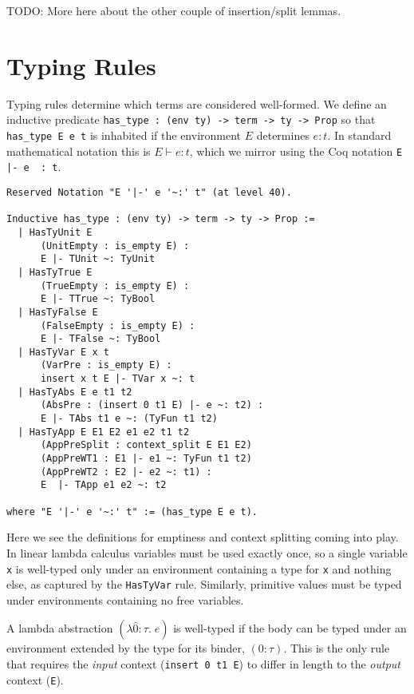 \documentclass[]{unswthesis}
\newcommand{\types}{\vdash}
\let\c\texttt
\let\i\textit
\begin{document}
TODO: More here about the other couple of insertion/split lemmas.


\section{Typing Rules}

Typing rules determine which terms are considered well-formed. We define an inductive predicate \c{has_type : (env ty) -> term -> ty -> Prop} so that \c{has_type E e t} is inhabited if the environment $E$ determines $e : t$. In standard mathematical notation this is $E \types e : t$, which we mirror using the Coq notation \c{E |- e ~: t}.

\begin{verbatim}
Reserved Notation "E '|-' e '~:' t" (at level 40).

Inductive has_type : (env ty) -> term -> ty -> Prop :=
  | HasTyUnit E
      (UnitEmpty : is_empty E) :
      E |- TUnit ~: TyUnit
  | HasTyTrue E
      (TrueEmpty : is_empty E) :
      E |- TTrue ~: TyBool
  | HasTyFalse E
      (FalseEmpty : is_empty E) :
      E |- TFalse ~: TyBool
  | HasTyVar E x t
      (VarPre : is_empty E) :
      insert x t E |- TVar x ~: t
  | HasTyAbs E e t1 t2
      (AbsPre : (insert 0 t1 E) |- e ~: t2) :
      E |- TAbs t1 e ~: (TyFun t1 t2)
  | HasTyApp E E1 E2 e1 e2 t1 t2
      (AppPreSplit : context_split E E1 E2)
      (AppPreWT1 : E1 |- e1 ~: TyFun t1 t2)
      (AppPreWT2 : E2 |- e2 ~: t1) :
      E  |- TApp e1 e2 ~: t2

where "E '|-' e '~:' t" := (has_type E e t).
\end{verbatim}

Here we see the definitions for emptiness and context splitting coming into play. In linear lambda calculus variables must be used exactly once, so a single variable \c{x} is well-typed only under an environment containing a type for \c{x} and nothing else, as captured by the \c{HasTyVar} rule. Similarly, primitive values must be typed under environments containing no free variables.

A lambda abstraction $(\lambda \hat{0} : \tau. \; e)$ is well-typed if the body can be typed under an environment extended by the type for its binder, $(0 : \tau)$. This is the only rule that requires the \i{input} context (\c{insert 0 t1 E}) to differ in length to the \i{output} context (\c{E}).
\end{document}
